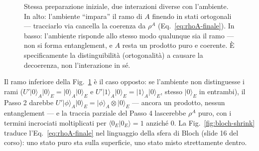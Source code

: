 \documentclass[11pt,a4paper]{article}
\newcommand{\ket}[1]{\lvert #1 \rangle}
\newcommand{\braket}[1]{\langle #1 \rangle}
\begin{document}
\begin{figure}[htbp]
\centering
{}
\caption{Stessa preparazione iniziale, due interazioni diverse con l'ambiente. In
alto: l'ambiente ``impara'' il ramo di $A$ finendo in stati ortogonali --- tracciarlo
via cancella la coerenza da $\rho^A$ (Eq.~\eqref{eq:rhoA-finale}). In basso:
l'ambiente risponde allo stesso modo qualunque sia il ramo --- non si forma
entanglement, e $A$ resta un prodotto puro e coerente. È specificamente la
distinguibilità (ortogonalità) a causare la decoerenza, non l'interazione in sé.}
\label{fig:decoerenza-branching}
\end{figure}

Il ramo inferiore della Fig.~\ref{fig:decoerenza-branching} è il caso opposto: se
l'ambiente non distinguesse i rami ($U'\ket0_A\ket0_E=\ket0_A\ket0_E$ e
$U'\ket1_A\ket0_E=\ket1_A\ket0_E$, stesso $\ket0_E$ in entrambi), il Passo 2
darebbe $U'\ket\phi_A\ket0_E=\ket\phi_A\otimes\ket0_E$ --- ancora un prodotto, nessun
entanglement --- e la traccia parziale del Passo 4 lascerebbe $\rho^A$ puro, con i
termini incrociati moltiplicati per $\braket{0_E|0_E}=1$ anziché $0$. La Fig.~\ref{fig:bloch-shrink}
traduce l'Eq.~\eqref{eq:rhoA-finale} nel linguaggio della sfera di Bloch (slide 16 del
corso): uno stato puro sta sulla superficie, uno stato misto strettamente dentro.
\end{document}
